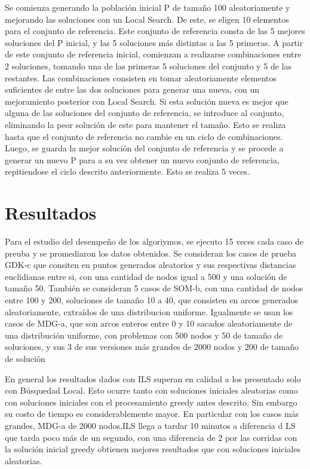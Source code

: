 \documentclass{ci5652}
\begin{document}
Se comienza generando la población inicial P de tamaño 100 aleatoriamente y mejorando las soluciones con un Local Search. De este, se eligen 10 elementos para el conjunto de referencia. Este conjunto de referencia consta de las 5 mejores soluciones del P inicial, y las 5 soluciones más distintas a las 5 primeras. A partir de este conjunto de referencia inicial, comienzan a realizarse combinaciones entre 2 soluciones, tomando una de las primeras 5 soluciones del conjunto y 5 de las restantes. Las combinaciones consisten en tomar aleatoriamente elementos suficientes de entre las dos soluciones para generar una nueva, con un mejoramiento posterior con Local Search. Si esta solución nueva es mejor que alguna de las soluciones del conjunto de referencia, se introduce al conjunto, eliminando la peor solución de este para mantener el tamaño. Esto se realiza hasta que el conjunto de referencia no cambie en un ciclo de combinaciones. Luego, se guarda la mejor solución del conjunto de referencia y se procede a generar un nuevo P para a su vez obtener un nuevo conjunto de referencia, repitiendose el ciclo descrito anteriormente. Esto se realiza 5 veces.


\section{Resultados}
Para el estudio del desempeño de los algoriymos, se ejecuto 15 veces cada caso de preuba y se promediaron
los datos obtenidos. Se consideran los casos de prueba GDK-c que consiten en puntos generados aleatorios y
sus respectivas distancias euclidianas entre si, con una cantidad de nodos igual a 500 y una solución de tamaño 50.
También se consideran 5 casos de SOM-b, con una cantidad de nodos entre 100 y 200, soluciones de tamaño 10 a 40, que consisten
en arcos generados aleatoriamente, extraídos de una distribucion uniforme. Igualmente se usan los casos de MDG-a, que
son arcos enteros entre 0 y 10 sacados aleatoriamente de una distribución uniforme, con problemas con 500 nodos y 50 de tamaño de soluciones, y sus 3 de sus versiones más grandes de 2000 nodos y 200 de tamaño de solución

En general los resultados dados con ILS superan en calidad a los presentado solo con Búsquedad Local.
Esto ocurre tanto con soluciones iniciales aleatorias como con soluciones iniciales con el procesamiento
greedy antes descrito. Sin embargo su costo de tiempo es considerablemente mayor. En particular con los casos
más grandes, MDG-a de 2000 nodos,ILS llega a tardar 10 minutos a diferencia d LS que tarda poco más de un segundo,
con una diferencia de 2%
por las corridas con la solución inicial greedy obtienen mejores resultados que con soluciones iniciales
aleatorias.
\end{document}
